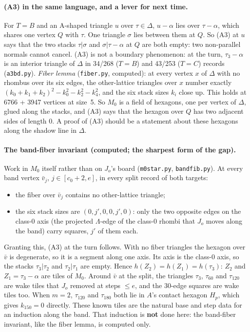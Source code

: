 \documentclass[11pt]{article}
\theoremstyle{definition}\newtheorem{definition}[theorem]{Definition}\newtheorem{remark}[theorem]{Remark}
\begin{document}
\paragraph{(A3) in the same language, and a lever for next time.} For $T=B$ and an A-shaped triangle $u$ over $\tau\in\Delta$, $u-\alpha$ lies over $\tau-\alpha$, which shares one vertex $Q$ with $\tau$. One triangle $\sigma$ lies between them at $Q$. So (A3) at $u$ says that the two stacks $\tau|\sigma$ and $\sigma|\tau-\alpha$ at $Q$ are both empty: two non-parallel normals cannot cancel. (A3) is not a boundary phenomenon: at the turn, $\tau_3-\alpha$ is an interior triangle of $\Delta$ in 34/268 ($T=B$) and 43/253 ($T=C$) records (\texttt{a3bd.py}). \emph{Fiber lemma} (\texttt{fiber.py}, computed): at every vertex $x$ of $\Delta$ with no rhombus over its six edges, the other-lattice triangles over $x$ number exactly $(k_0+k_1+k_2)^2-k_0^2-k_2^2-k_4^2$, and the six stack sizes $k_i$ close up. This holds at 6766 + 3947 vertices at size~5. So $M_0$ is a field of hexagons, one per vertex of $\Delta$, glued along the stacks, and (A3) says that the hexagon over $Q$ has two adjacent sides of length $0$. A proof of (A3) should be a statement about these hexagons along the shadow line in $\Delta$.

\paragraph{The band-fiber invariant (computed; the sharpest form of the gap).} Work in $M_0$ itself rather than on $J_o$'s board (\texttt{m0star.py}, \texttt{bandfib.py}). At every band vertex $\bar v_j$, $j\in[c_0+2,e]$, in every split record of both targets:
\begin{itemize}
\item the fiber over $\bar v_j$ contains no other-lattice triangle;
\item the six stack sizes are $(0,j',0,0,j',0)$: only the two opposite edges on the class-0 axis (the projected $\Lambda$-edge of the class-0 rhombi that $J_o$ moves along the band) carry squares, $j'$ of them each.
\end{itemize}
Granting this, (A3) at the turn follows. With no fiber triangles the hexagon over $\bar v$ is degenerate, so it is a segment along one axis. Its axis is the class-0 axis, so the stacks $\tau_3|\tau_2$ and $\tau_2|\tau_1$ are empty. Hence $h(Z_2)=h(Z_1)=h(\tau_3)$: $Z_2$ and $Z_1=\tau_3-\alpha$ are tiles of $M_0$. Around $\bar v$ at the split, the triangles $\tau_3$, $\tau_{60}$ and $\tau_{120}$ are wake tiles that $J_o$ removed at steps $\le e$, and the 30-edge squares are wake tiles too. When $m=2$, $\tau_{120}$ and $\tau_{180}$ both lie in $A$'s contact hexagon $H_p$, which gives $k_{150}=0$ directly. These known tiles are the natural base and step data for an induction along the band. That induction is \textbf{not} done here: the band-fiber invariant, like the fiber lemma, is computed only.
\end{document}
